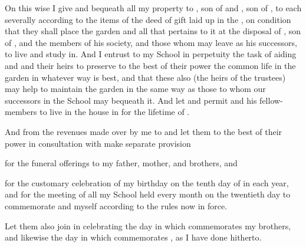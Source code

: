 \documentclass{stex}
\begin{document}

\noindent On this wise I give and bequeath all my property to , son of  and , son of , to each severally according to the items of the deed of gift laid up in the , on condition that they shall place the garden and all that pertains to it at the disposal of , son of , and the members of his society, and those whom  may leave as his successors, to live and study in.
And I entrust to my School in perpetuity the task of aiding  and  and their heirs to preserve to the best of their power the common life in the garden in whatever way is best, and that these also (the heirs of the trustees) may help to maintain the garden in the same way as those to whom our successors in the School may bequeath it.
And let  and  permit  and his fellow-members to live in the house in  for the lifetime of .

And from the revenues made over by me to  and  let them to the best of their power in consultation with  make separate provision
\begin{enumerate*}[label={(\arabic*)}]
  \item for the funeral offerings to my father, mother, and brothers, and
  \item for the customary celebration of my birthday on the tenth day of  in each year, and for the meeting of all my School held every month on the twentieth day to commemorate  and myself according to the rules now in force.
\end{enumerate*}
Let them also join in celebrating the day in  which commemorates my brothers, and likewise the day in  which commemorates , as I have done hitherto.
\end{document}
